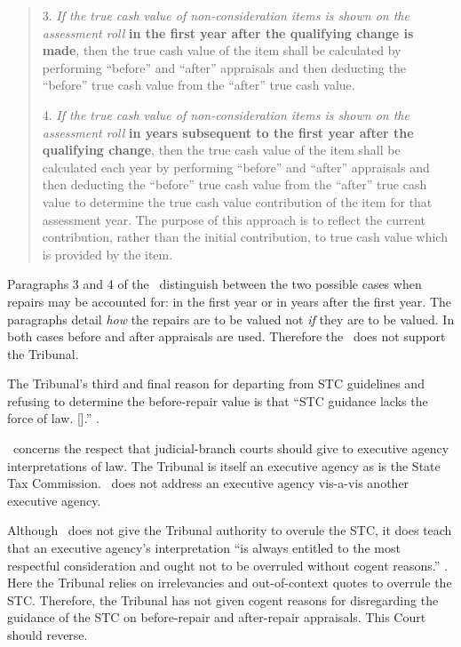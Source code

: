 \documentclass[12pt,\documentclassflag]{michiganCourtOfAppealsBrief}
\begin{document}
\begin{quotation}
3. {\em If the true cash value of non-consideration items is shown on the assessment roll} \textbf{in the first year after the qualifying change is made}, then the true cash value of the item shall be calculated by performing ``before'' and ``after'' appraisals and then deducting the ``before'' true cash value from the ``after'' true cash value.

4. {\em If the true cash value of non-consideration items is shown on the assessment roll} \textbf{in years subsequent to the first year after the qualifying change}, then the true cash value of the item shall be calculated each year by performing ``before'' and ``after'' appraisals and then deducting the ``before'' true cash value from the ``after'' true cash value to determine the true cash value contribution of the item for that assessment year. The purpose of this approach is to reflect the current contribution, rather than the initial contribution, to true cash value which is provided by the item.
\end{quotation}

Paragraphs 3 and 4 of the \cite[s]{STC Bulletin}\ distinguish between the two possible cases when repairs may be accounted for: in the first year or in years after the first year. The paragraphs detail {\em how} the repairs are to be valued not {\em if} they are to be valued. In both cases before and after appraisals are used. Therefore the \cite[s]{STC Bulletin}\ does not support the Tribunal.

The Tribunal's third and final reason for departing from STC guidelines and refusing to determine the before-repair value is that ``STC guidance lacks the force of law. [].'' \reconsiderationDenied[2].

\cite[s]{Rovas}\ concerns the respect that judicial-branch courts should give to executive agency interpretations of law. The Tribunal is itself an executive agency as is the State Tax Commission. \cite[s]{Rovas}\ does not address an executive agency vis-a-vis another executive agency.

Although \cite[s]{Rovas}\ does not give the Tribunal authority to overule the STC, it does teach that an executive agency's interpretation ``is always entitled to the most respectful consideration and ought not to be overruled without cogent reasons.'' . Here the Tribunal relies on irrelevancies and out-of-context quotes to overrule the STC.
Therefore, the Tribunal has not given cogent reasons for disregarding the guidance of the STC on before-repair and after-repair appraisals. This Court should reverse. 
\end{document}
